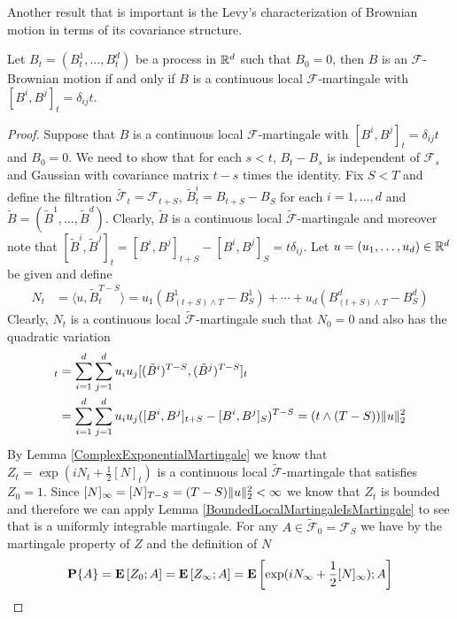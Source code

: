 Another result that is important is the Levy's characterization of Brownian motion in terms of its covariance structure.
\begin{thm}\label{LevyCharacterizationOfBrownianMotion}Let $B_t=(B^1_t, \dotsc, B^d_t)$ be a process in $\mathbb{R}^d$ such that $B_0=0$, then $B$ is an $\mathcal{F}$-Brownian motion if and only if $B$ is a continuous local $\mathcal{F}$-martingale with $[B^i,B^j]_t = \delta_{ij} t$.
\end{thm}
\begin{proof}
Suppose that $B$ is a continuous local  $\mathcal{F}$-martingale with $[B^i,B^j]_t = \delta_{ij} t$ and $B_0 = 0$.  We need to show that for each $s < t$,  $B_t - B_s$  is independent of $\mathcal{F}_s$ and Gaussian with covariance matrix $t -s$ times the identity.   Fix $S < T$ and define  the filtration $\tilde{\mathcal{F}}_t = \mathcal{F}_{t+S}$,  $\tilde{B}^i_t = B_{t+S} - B_S$ for each $i=1, \dotsc, d$ and $\tilde{B} = (\tilde{B}^1, \dotsc, \tilde{B}^d)$.  Clearly, $\tilde{B}$ is a continuous local $\tilde{\mathcal{F}}$-martingale and moreover note that $[\tilde{B}^i,\tilde{B}^j]_t = [B^i,B^j]_{t+S} - [B^i,B^j]_S = t \delta_{ij}$.  Let $u=(u_1, \dotsc, u_d) \in \mathbb{R}^d$ be given and define 
\begin{align*}
N_t &= \langle u , \tilde{B}_t^{T-S} \rangle = u_1 (B_{(t+S) \wedge T}^1 - B_S^1) + \dotsb + u_d (B_{(t + S) \wedge T}^d - B_S^d)
\end{align*}  
Clearly, $N_t$ is a continuous local $\tilde{\mathcal{F}}$-martingale such that $N_0 = 0$ and also has the quadratic variation
\begin{align*}
[N]_t &= \sum_{i=1}^d \sum_{j=1}^du_iu_j [(\tilde{B}^i)^{T-S},  (\tilde{B}^j)^{T-S}]_t \\
&= \sum_{i=1}^d \sum_{j=1}^du_iu_j ([B^i, B^j ]_{t+S} -  [B^i, B^j ]_{S})^{T-S}=  (t \wedge (T-S)) \norm{u}_2^2\\
\end{align*}
By Lemma \ref{ComplexExponentialMartingale} we know that $Z_t = \exp(iN_t + \frac{1}{2} [N]_t)$ is a continuous local $\tilde{\mathcal{F}}$-martingale that satisfies $Z_0 = 1$.  Since $[N]_\infty = [N]_{T-S} = (T-S) \lVert u \rVert_2^2< \infty$ we know that $Z_t$ is bounded and therefore we can apply Lemma \ref{BoundedLocalMartingaleIsMartingale} to see that is a uniformly integrable martingale.
For any $A \in \tilde{\mathcal{F}}_0 = \mathcal{F}_S$ we have by the martingale property of $Z$ and the definition of $N$
\begin{align*}
\probability{A} &= \expectation{Z_0 ; A} = \expectation{Z_\infty ; A} = \expectation{ \exp(iN_\infty + \frac{1}{2} [N]_\infty); A} \\

\end{align*}
\end{proof}
